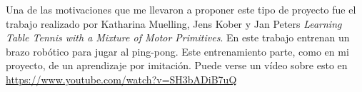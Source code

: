 

Una de las motivaciones que me llevaron a proponer este tipo de proyecto fue el trabajo realizado por Katharina Muelling, Jens Kober y Jan Peters \emph{Learning Table Tennis with a Mixture of Motor Primitives}\cite{table_tennis}. En este trabajo entrenan un brazo robótico para jugar al ping-pong. Este entrenamiento parte, como en mi proyecto, de un aprendizaje por imitación. Puede verse un vídeo sobre esto en \url{https://www.youtube.com/watch?v=SH3bADiB7uQ}


